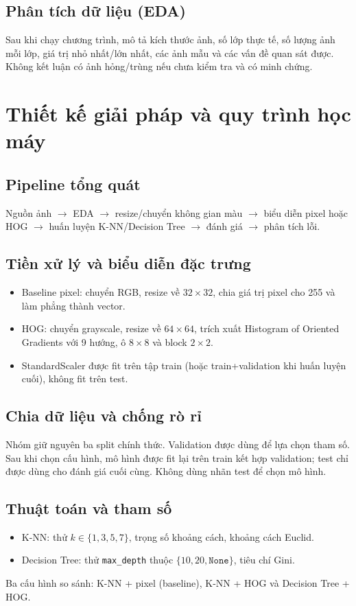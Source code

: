 \documentclass[12pt,a4paper]{report}
\begin{document}
\section{Phân tích dữ liệu (EDA)}
Sau khi chạy chương trình, mô tả kích thước ảnh, số lớp thực tế, số lượng ảnh mỗi lớp, giá trị nhỏ nhất/lớn nhất, các ảnh mẫu và các vấn đề quan sát được. Không kết luận có ảnh hỏng/trùng nếu chưa kiểm tra và có minh chứng.

\chapter{Thiết kế giải pháp và quy trình học máy}
\section{Pipeline tổng quát}
Nguồn ảnh $\rightarrow$ EDA $\rightarrow$ resize/chuyển không gian màu $\rightarrow$ biểu diễn pixel hoặc HOG $\rightarrow$ huấn luyện K-NN/Decision Tree $\rightarrow$ đánh giá $\rightarrow$ phân tích lỗi.

\section{Tiền xử lý và biểu diễn đặc trưng}
\begin{itemize}
\item Baseline pixel: chuyển RGB, resize về $32\times32$, chia giá trị pixel cho 255 và làm phẳng thành vector.
\item HOG: chuyển grayscale, resize về $64\times64$, trích xuất Histogram of Oriented Gradients với 9 hướng, ô $8\times8$ và block $2\times2$.
\item StandardScaler được fit trên tập train (hoặc train+validation khi huấn luyện cuối), không fit trên test.
\end{itemize}

\section{Chia dữ liệu và chống rò rỉ}
Nhóm giữ nguyên ba split chính thức. Validation được dùng để lựa chọn tham số. Sau khi chọn cấu hình, mô hình được fit lại trên train kết hợp validation; test chỉ được dùng cho đánh giá cuối cùng. Không dùng nhãn test để chọn mô hình.

\section{Thuật toán và tham số}
\begin{itemize}
\item K-NN: thử $k\in\{1,3,5,7\}$, trọng số khoảng cách, khoảng cách Euclid.
\item Decision Tree: thử \texttt{max\_depth} thuộc $\{10,20,\texttt{None}\}$, tiêu chí Gini.
\end{itemize}
Ba cấu hình so sánh: K-NN + pixel (baseline), K-NN + HOG và Decision Tree + HOG.
\end{document}
